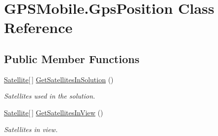 \hypertarget{class_g_p_s_mobile_1_1_gps_position}{
\section{GPSMobile.GpsPosition Class Reference}
\label{class_g_p_s_mobile_1_1_gps_position}
}
\subsection*{Public Member Functions}
\begin{DoxyCompactItemize}
\item 
\hyperlink{class_g_p_s_mobile_1_1_satellite}{Satellite}\mbox{[}$\,$\mbox{]} \hyperlink{class_g_p_s_mobile_1_1_gps_position_a5dbc8646aecb0273e8d0a95046497591}{GetSatellitesInSolution} ()
\begin{DoxyCompactList}\small\item\em Satellites used in the solution. \item\end{DoxyCompactList}\item 
\hyperlink{class_g_p_s_mobile_1_1_satellite}{Satellite}\mbox{[}$\,$\mbox{]} \hyperlink{class_g_p_s_mobile_1_1_gps_position_a68e3bfcd6b812463ec2f035ca4e5a32b}{GetSatellitesInView} ()
\begin{DoxyCompactList}\small\item\em Satellites in view. \item\end{DoxyCompactList}\end{DoxyCompactItemize}
